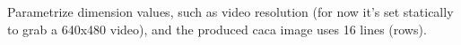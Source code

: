 
\begin{DoxyRefList}
\item[\label{todo__todo000001}%
\hypertarget{todo__todo000001}{}%
\-File \hyperlink{cacatalk_8h}{cacatalk.h} ]
\begin{DoxyItemize}
\item \-Parametrize dimension values, such as video resolution (for now it's set statically to grab a 640x480 video), and the produced caca image uses 16 lines (rows).
\end{DoxyItemize}
\end{DoxyRefList}